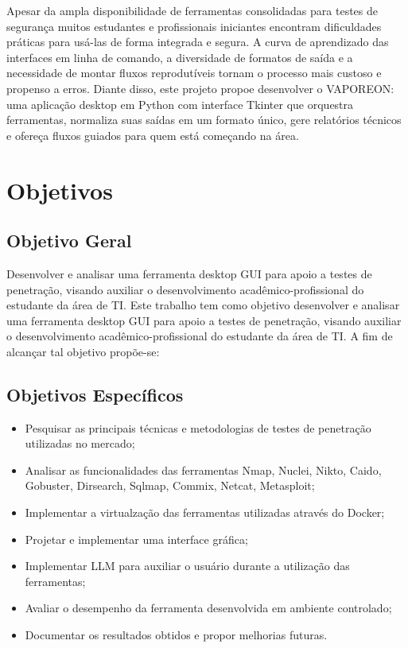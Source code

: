         Apesar da ampla disponibilidade de ferramentas consolidadas para testes de segurança muitos estudantes e profissionais iniciantes   
        encontram dificuldades práticas para usá-las de forma integrada e segura. A curva de aprendizado das interfaces em linha de comando, 
        a diversidade de formatos de saída e a necessidade de montar
        fluxos reprodutíveis tornam o processo mais custoso e propenso a erros\citep{alaryani2024penthack}. Diante disso, este projeto propoe desenvolver o VAPOREON:
        uma aplicação desktop em Python com interface Tkinter que orquestra ferramentas, normaliza suas saídas em um
        formato único, gere relatórios técnicos e ofereça fluxos guiados para quem está começando na área.

\section{Objetivos}
    \subsection{Objetivo Geral}
        Desenvolver e analisar uma ferramenta desktop GUI para apoio a testes de penetração, visando auxiliar o desenvolvimento acadêmico-profissional do estudante da área de TI.
        Este trabalho tem como objetivo desenvolver e analisar uma ferramenta desktop GUI para apoio a testes de penetração, visando auxiliar o 
        desenvolvimento acadêmico-profissional do estudante da área de TI. A fim de alcançar tal objetivo propõe-se:
    \subsection{Objetivos Específicos}
        \begin{itemize}
            \item Pesquisar as principais técnicas e metodologias de testes de penetração utilizadas no mercado;
            \item Analisar as funcionalidades das ferramentas Nmap, Nuclei, Nikto, Caido, Gobuster, Dirsearch, Sqlmap, Commix, Netcat, Metasploit;
            \item Implementar a virtualzação das ferramentas utilizadas através do Docker;
            \item Projetar e implementar uma interface gráfica;
            \item Implementar LLM para auxiliar o usuário durante a utilização das ferramentas;
            \item Avaliar o desempenho da ferramenta desenvolvida em ambiente controlado;
            \item Documentar os resultados obtidos e propor melhorias futuras.
        \end{itemize}
    

